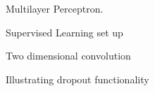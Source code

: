 \begin{figure}
	\centering
    
    \caption{Multilayer Perceptron.}
    \label{fig:multilayer_perceptron}
\end{figure}

\begin{figure}
	\centering
    
    \caption{Supervised Learning set up}
    \label{fig:SL_setup}
\end{figure}

\begin{figure}
	\centering
    
    \caption{Two dimensional convolution}
    \label{fig:2dconv}
\end{figure}

\begin{figure}
	\centering
    
    \caption{Illustrating dropout functionality}
    \label{fig:Dropout_function}
\end{figure}


